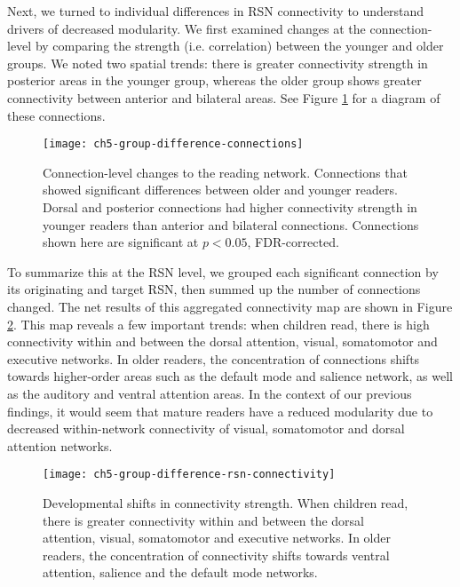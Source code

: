 Next, we turned to individual differences in RSN connectivity to understand drivers of decreased modularity. We first examined changes at the connection-level by comparing the strength (i.e. correlation) between the younger and older groups. We noted two spatial trends: there is greater connectivity strength in posterior areas in the younger group, whereas the older group shows greater connectivity between anterior and bilateral areas. See Figure \ref{fig:ch5-group-difference-connections} for a diagram of these connections.

\begin{figure}[t]
	\centering
	\texttt{[image: ch5-group-difference-connections]}
    \caption[Connection-level changes in the reading network]{Connection-level changes to the reading network. Connections that showed significant differences between older and younger readers. Dorsal and posterior connections had higher connectivity strength in younger readers than anterior and bilateral connections. Connections shown here are significant at $p < 0.05$, FDR-corrected.}
	\label{fig:ch5-group-difference-connections}
\end{figure}

To summarize this at the RSN level, we grouped each significant connection by its originating and target RSN, then summed up the number of connections changed. The net results of this aggregated connectivity map are shown in Figure \ref{fig:ch5-group-difference-rsn-connectivity}. This map reveals a few important trends: when children read, there is high connectivity within and between the dorsal attention, visual, somatomotor and executive networks. In older readers, the concentration of connections shifts towards higher-order areas such as the default mode and salience network, as well as the auditory and ventral attention areas.  In the context of our previous findings, it would seem that mature readers have a reduced modularity due to decreased within-network connectivity of visual, somatomotor and dorsal attention networks.

\begin{figure}[t!]
	\centering
	\texttt{[image: ch5-group-difference-rsn-connectivity]}
    \caption[Developmental shifts in RSN interactivity]{Developmental shifts in connectivity strength. When children read, there is greater connectivity within and between the dorsal attention, visual, somatomotor and executive networks. In older readers, the concentration of connectivity shifts towards ventral attention, salience and the default mode networks.}
	\label{fig:ch5-group-difference-rsn-connectivity}
\end{figure}

